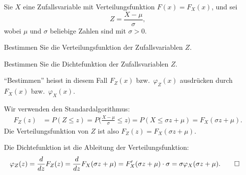 Sie $X$ eine Zufallsvariable mit Verteilungsfunktion $F(x)=F_X(x)$, und
sei\[
Z=\frac{X-\mu}{\sigma},
\]
wobei $\mu$ und $\sigma$ beliebige Zahlen sind mit $\sigma > 0$.

\begin{teilaufgaben}
\item Bestimmen Sie die Verteilungsfunktion der Zufallsvariablen $Z$.
\item Bestimmen Sie die Dichtefunktion der Zufallsvariablen $Z$.
\end{teilaufgaben}
\begin{hinweis}
``Bestimmen'' heisst in diesem Fall $F_Z(x)$ bzw.~$\varphi_Z(x)$ ausdrücken durch
$F_X(x)$ bzw.~$\varphi_X(x)$.
\end{hinweis}


\begin{loesung}
\begin{teilaufgaben}
\item Wir verwenden den Standardalgorithmus:
\begin{align*}
F_Z(z)&=P(Z\le z)
=P\biggl(\frac{X-\mu}{\sigma}\le z\biggr)
=P(X\le \sigma z+\mu)=F_X(\sigma z+\mu).
\end{align*}
Die Verteilungsfunktion von $Z$ ist also $F_Z(z)=F_X(\sigma z+\mu)$.
\item Die Dichtefunktion ist die Ableitung der Verteilungsfunktion:
\begin{align*}
\varphi_Z(z)&=\frac{d}{dz}F_Z(z)
=\frac{d}{dz}F_X(\sigma z+ \mu)
=F_X'(\sigma z+ \mu)\cdot \sigma=\sigma\varphi_X(\sigma z+\mu).
\qedhere
\end{align*}
\end{teilaufgaben}
\end{loesung}

